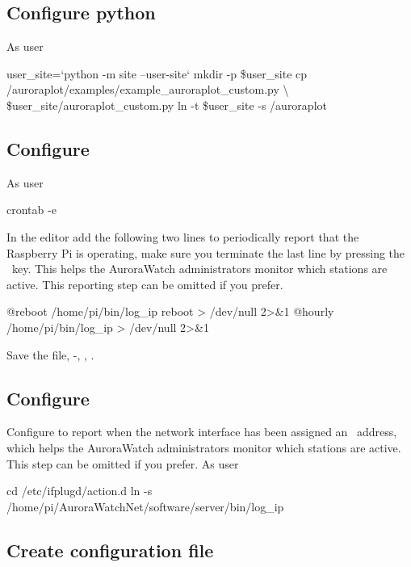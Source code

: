 \subsection{Configure python}

As user \piUser 

\begin{Cmd}
user_site=`python -m site --user-site`
mkdir -p \$user_site
cp \mytilde/auroraplot/examples/example_auroraplot_custom.py \textbackslash
    \$user_site/auroraplot_custom.py
ln -t \$user_site -s \mytilde/auroraplot
\end{Cmd}


\subsection{Configure \protect{}}
\label{sec:cron-configuration}
As user \piUser
\begin{Cmd}
crontab -e
\end{Cmd}

In the  editor add the following two lines to
periodically report that the Raspberry Pi is operating, make sure you
terminate the last line by pressing the \myreturn\ key. This helps
the AuroraWatch administrators monitor which stations are active. This
reporting step can be omitted if you prefer.
\begin{Cmd}
@reboot /home/pi/bin/log_ip reboot > /dev/null 2>&1
@hourly /home/pi/bin/log_ip > /dev/null 2>&1
\end{Cmd}

Save the file, -, ,
\myreturn.

\subsection{Configure \protect{}}

Configure  to report when the network interface has
been assigned an \ip\ address, which helps the AuroraWatch
administrators monitor which stations are active. This step can be
omitted if you prefer. As user \rootUser
\begin{Cmd}
cd /etc/ifplugd/action.d
ln -s /home/pi/AuroraWatchNet/software/server/bin/log_ip
\end{Cmd}

\subsection{Create configuration file}

